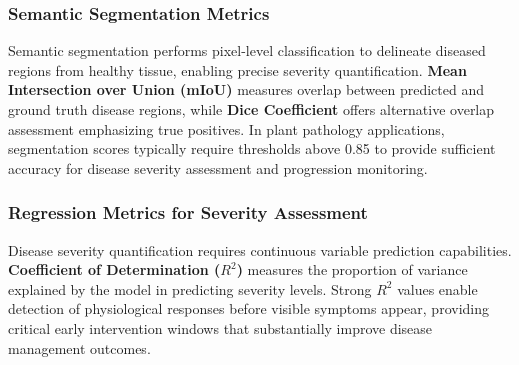 \documentclass[sn-mathphys]{sn-jnl}
\theoremstyle{thmstyleone}%
\theoremstyle{thmstyletwo}%
\theoremstyle{thmstylethree}%
\begin{document}
\subsubsection{Semantic Segmentation Metrics}
Semantic segmentation performs pixel-level classification to delineate diseased regions from healthy tissue, enabling precise severity quantification. \textbf{Mean Intersection over Union (mIoU)} measures overlap between predicted and ground truth disease regions, while \textbf{Dice Coefficient} offers alternative overlap assessment emphasizing true positives. In plant pathology applications, segmentation scores typically require thresholds above 0.85 to provide sufficient accuracy for disease severity assessment and progression monitoring.

\subsubsection{Regression Metrics for Severity Assessment}
Disease severity quantification requires continuous variable prediction capabilities. \textbf{Coefficient of Determination ($R^2$)} measures the proportion of variance explained by the model in predicting severity levels. Strong $R^2$ values enable detection of physiological responses before visible symptoms appear, providing critical early intervention windows that substantially improve disease management outcomes.
\end{document}
